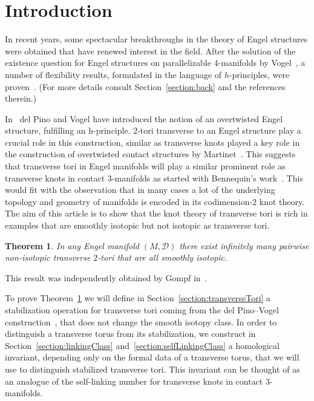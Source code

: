 \documentclass{amsart} %
\newcommand{\D}{\mathcal{D}}
\theoremstyle{thm}
\newtheorem{thm}[Theorem]{Theorem}
\theoremstyle{definition}
\begin{document}
\section{Introduction}

In recent years, some spectacular breakthroughs in the theory of Engel structures were obtained that have renewed interest in the field. After the solution of the existence question for Engel structures on parallelizable 4-manifolds by Vogel~\cite{Vo09}, a number of flexibility results, formulated in the language of $h$-principles, were proven~\cite{CPPP17,PV20,CPP20,PP19}. (For more details consult Section~\ref{section:back} and the references therein.)

In~\cite{PV20} del Pino and Vogel have introduced the notion of an overtwisted Engel structure, fulfilling an h-principle. $2$-tori transverse to an Engel structure play a crucial role in this construction, similar as transverse knots played a key role in the construction of overtwisted contact structures by Martinet~\cite{Ma71,Ge08}.
This suggests that transverse tori in Engel manifolds will play a similar prominent role as transverse knots in contact $3$-manifolds as started with Bennequin's work~\cite{Be82}. This would fit with the observation that in many cases a lot of the underlying topology and geometry of manifolds is encoded in its codimension-$2$ knot theory. The aim of this article is to show that the knot theory of transverse tori is rich in examples that are smoothly isotopic but not isotopic as transverse tori. %



\begin{thm}\label{thm:mainEng}
In any Engel manifold $(M,\D)$ there exist infinitely many pairwise non-isotopic transverse $2$-tori that are all smoothly isotopic.
\end{thm}

This result was independently obtained by Gompf in~\cite{Go22}.

To prove Theorem~\ref{thm:mainEng} we will define in Section~\ref{section:transverseTori} a stabilization operation for transverse tori coming from the del Pino--Vogel construction~\cite{PV20}, that does not change the smooth isotopy class. In order to distinguish a transverse torus from its stabilization, we construct in Section~\ref{section:linkingClass} and~\ref{section:selfLinkingClass} a homological invariant, depending only on the formal data of a transverse torus, that we will use to distinguish stabilized transverse tori. This invariant can be thought of as an analogue of the self-linking number for transverse knots in contact $3$-manifolds. 
\end{document}
